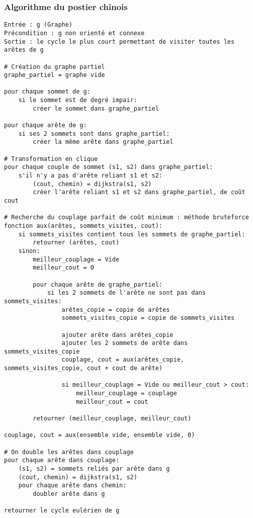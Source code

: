 \documentclass{scrartcl}
\begin{document}
    \subsubsection{Algorithme du postier chinois}
      \begin{lstlisting}
Entrée : g (Graphe)
Précondition : g non orienté et connexe
Sortie : le cycle le plus court permettant de visiter toutes les arêtes de g

# Création du graphe partiel
graphe_partiel = graphe vide

pour chaque sommet de g:
    si le sommet est de degré impair:
        créer le sommet dans graphe_partiel

pour chaque arête de g:
    si ses 2 sommets sont dans graphe_partiel:
        créer la même arête dans graphe_partiel

# Transformation en clique
pour chaque couple de sommet (s1, s2) dans graphe_partiel:
    s'il n'y a pas d'arête reliant s1 et s2:
        (cout, chemin) = dijkstra(s1, s2)
        créer l'arête reliant s1 et s2 dans graphe_partiel, de coût cout

# Recherche du couplage parfait de coût minimum : méthode bruteforce
fonction aux(arêtes, sommets_visites, cout):
    si sommets_visites contient tous les sommets de graphe_partiel:
        retourner (arêtes, cout)
    sinon:
        meilleur_couplage = Vide
        meilleur_cout = 0

        pour chaque arête de graphe_partiel:
            si les 2 sommets de l'arête ne sont pas dans sommets_visites:
                arêtes_copie = copie de arêtes
                sommets_visites_copie = copie de sommets_visites

                ajouter arête dans arêtes_copie
                ajouter les 2 sommets de arête dans sommets_visites_copie
                couplage, cout = aux(arêtes_copie, sommets_visites_copie, cout + cout de arête)

                si meilleur_couplage = Vide ou meilleur_cout > cout:
                    meilleur_couplage = couplage
                    meilleur_cout = cout

        retourner (meilleur_couplage, meilleur_cout)

couplage, cout = aux(ensemble vide, ensemble vide, 0)

# On double les arêtes dans couplage
pour chaque arête dans couplage:
    (s1, s2) = sommets reliés par arête dans g
    (cout, chemin) = dijkstra(s1, s2)
    pour chaque arête dans chemin:
        doubler arête dans g

retourner le cycle eulérien de g
      \end{lstlisting}
\end{document}
